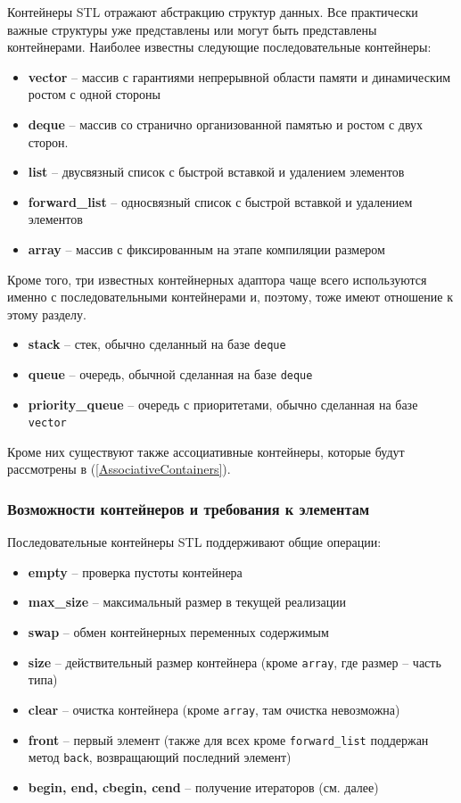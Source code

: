 \documentclass[a4paper,12pt,oneside]{article}
\begin{document}
Контейнеры STL отражают абстракцию структур данных. Все практически важные структуры уже представлены или могут быть представлены контейнерами. Наиболее известны следующие последовательные контейнеры:

\begin{itemize}
\item \textbf{vector} -- массив с гарантиями непрерывной области памяти и динамическим ростом с одной стороны
\item \textbf{deque} -- массив со странично организованной памятью и ростом с двух сторон.
\item \textbf{list} -- двусвязный список с быстрой вставкой и удалением элементов
\item \textbf{forward\_list} -- односвязный список с быстрой вставкой и удалением элементов
\item \textbf{array} -- массив с фиксированным на этапе компиляции размером
\end{itemize}

Кроме того, три известных контейнерных адаптора чаще всего используются именно с последовательными контейнерами и, поэтому, тоже имеют отношение к этому разделу.

\begin{itemize}
\item \textbf{stack} -- стек, обычно сделанный на базе \lstinline!deque!
\item \textbf{queue} -- очередь, обычной сделанная на базе \lstinline!deque!
\item \textbf{priority\_queue} -- очередь с приоритетами, обычно сделанная на базе \lstinline!vector!
\end{itemize}

Кроме них существуют также ассоциативные контейнеры, которые будут рассмотрены в (\ref{AssociativeContainers}).

\subsubsection{Возможности контейнеров и требования к элементам}\label{StandardOperations}

Последовательные контейнеры STL поддерживают общие операции: 

\begin{itemize}
\item \textbf{empty} -- проверка пустоты контейнера
\item \textbf{max\_size} -- максимальный размер в текущей реализации
\item \textbf{swap} -- обмен контейнерных переменных содержимым
\item \textbf{size} -- действительный размер контейнера (кроме \lstinline!array!, где размер -- часть типа)
\item \textbf{clear} -- очистка контейнера (кроме \lstinline!array!, там очистка невозможна)
\item \textbf{front} -- первый элемент (также для всех кроме \lstinline!forward_list! поддержан метод \lstinline!back!, возвращающий последний элемент)
\item \textbf{begin, end, cbegin, cend} -- получение итераторов (см. далее)
\end{itemize}
\end{document}
